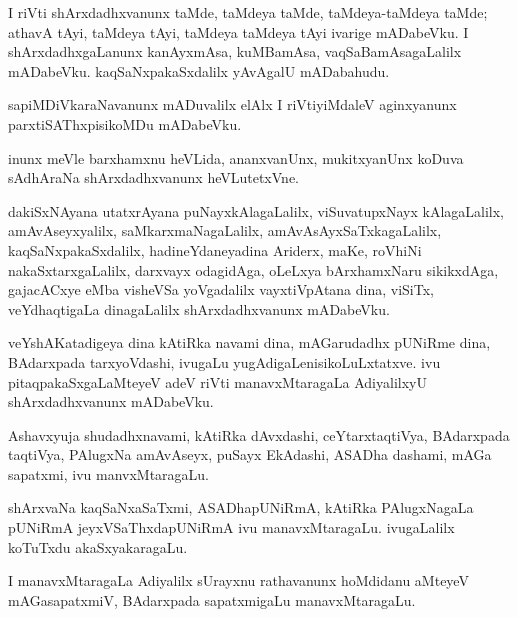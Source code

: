 \documentclass{article}
\begin{document}
\begin{mn}%
I riVti shArxdadhxvanunx taMde, taMdeya taMde, taMdeya-taMdeya taMde;
athavA tAyi, taMdeya tAyi, taMdeya taMdeya tAyi ivarige mADabeVku. I
shArxdadhxgaLanunx kanAyxmAsa, kuMBamAsa, vaqSaBamAsagaLalilx
mADabeVku. kaqSaNxpakaSxdalilx yAvAgalU mADabahudu.
\end{mn}

\begin{mn}
sapiMDiVkaraNavanunx mADuvalilx elAlx I riVtiyiMdaleV aginxyanunx
parxtiSAThxpisikoMDu mADabeVku.
\end{mn}

\begin{mn}
inunx meVle barxhamxnu heVLida, ananxvanUnx, mukitxyanUnx koDuva
sAdhAraNa shArxdadhxvanunx heVLutetxVne.
\end{mn}

\begin{mn}%
dakiSxNAyana utatxrAyana puNayxkAlagaLalilx, viSuvatupxNayx
kAlagaLalilx, amAvAseyxyalilx, saMkarxmaNagaLalilx,
amAvAsAyxSaTxkagaLalilx, kaqSaNxpakaSxdalilx, hadineYdaneyadina
Ariderx, maKe, roVhiNi nakaSxtarxgaLalilx, darxvayx odagidAga, oLeLxya
bArxhamxNaru sikikxdAga, gajacACxye eMba visheVSa yoVgadalilx
vayxtiVpAtana dina, viSiTx, veYdhaqtigaLa dinagaLalilx
shArxdadhxvanunx mADabeVku.
\end{mn}

\begin{mn}%
veYshAKatadigeya dina kAtiRka navami dina, mAGarudadhx pUNiRme dina,
BAdarxpada tarxyoVdashi, ivugaLu yugAdigaLenisikoLuLxtatxve. ivu
pitaqpakaSxgaLaMteyeV adeV riVti manavxMtaragaLa AdiyalilxyU
shArxdadhxvanunx mADabeVku.
\end{mn}

\begin{mn}%
Ashavxyuja shudadhxnavami, kAtiRka dAvxdashi, ceYtarxtaqtiVya,
BAdarxpada taqtiVya, PAlugxNa amAvAseyx, puSayx EkAdashi, ASADha
dashami, mAGa sapatxmi, ivu manvxMtaragaLu.
\end{mn}

\begin{mn}
shArxvaNa kaqSaNxaSaTxmi, ASADhapUNiRmA, kAtiRka PAlugxNagaLa pUNiRmA
jeyxVSaThxdapUNiRmA ivu manavxMtaragaLu. ivugaLalilx koTuTxdu akaSxyakaragaLu.
\end{mn}

\begin{mn}%
I manavxMtaragaLa Adiyalilx sUrayxnu rathavanunx hoMdidanu aMteyeV
mAGasapatxmiV, BAdarxpada sapatxmigaLu manavxMtaragaLu.
\end{mn}
\end{document}
